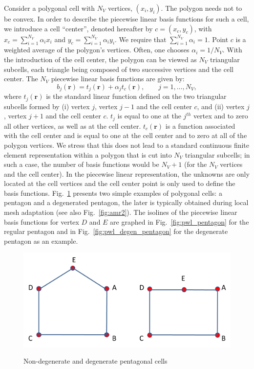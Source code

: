 \documentclass[preprint,10pt]{elsarticle}
\newcommand{\fig}[1]{Fig.~\ref{#1}}                      %
\newcommand\br{\mathbf{r}}
\renewcommand{\(}{\left(}
\renewcommand{\)}{\right)}
\renewcommand{\[}{\left[}
\renewcommand{\]}{\right]}
\begin{document}
Consider a polygonal cell with $N_V$ vertices, $(x_i,y_i)$. The polygon needs not 
to be convex. In order to describe the piecewise linear basis functions
for such a cell, we introduce a cell ``center'', denoted hereafter 
by $c=(x_c,y_c)$, with $x_c =\sum_{i=1}^{N_V} \alpha_{i} x_i$
and  $y_c = \sum_{i=1}^{N_V} \alpha_{i} y_i$. We require that
$\sum_{i=1}^{N_V} \alpha_{i} = 1$. Point $c$ is a weighted average
of the polygon's vertices. Often, one chooses $\alpha_i = 1 / N_V$.
With the introduction of the cell center, the polygon can be viewed as
$N_V$ triangular subcells, each triangle being composed of two
successive vertices and the cell center.
The $N_V$ piecewise linear basis functions are given by:
%
\begin{equation}
  b_j(\br) = t_j(\br) + \alpha_{j} t_c(\br) , \qquad j=1,\ldots,N_V ,
\end{equation}
%
where $t_j(\br)$ is the standard linear function defined on the two
triangular subcells formed by (i) vertex $j$, vertex $j-1$ and the cell center $c$,
and (ii) vertex $j$, vertex $j+1$ and the cell center $c$.
$t_j$ is equal to one at the $j^{th}$ vertex and to zero all other vertices,
as well as at the cell center.
$t_c(\br)$ is a function associated with the cell center and is equal to one 
at the cell center  and to zero at all of the polygon vertices.
%
We stress that this does not lead to a standard continuous finite element
representation within a polygon that is cut into $N_V$
triangular subcells; in such a case, the number of basis functions
would be $N_V+1$ (for the $N_V$ vertices and the cell center). In the
piecewise linear representation, the unknowns are only located at the cell 
vertices and the cell center point is only used to define the basis functions.
\fig{fig:pentagons} presents two simple examples of polygonal cells: a 
pentagon and a degenerated pentagon, the later is typically obtained
during local mesh adaptation (see also \fig{fig:amr2}).
The isolines of the piecewise linear basis functions for vertex $D$ and
$E$ are graphed in \fig{fig:pwl_pentagon} for the regular pentagon
and in \fig{fig:pwl_degen_pentagon} for the degenerate pentagon as an example.
%
\begin{figure}[!hbtp]
\centering
\includegraphics[scale=0.77]{pentagons.png}
\label{fig:pentagons}
\caption{Non-degenerate and degenerate pentagonal cells}
\end{figure}
\end{document}
